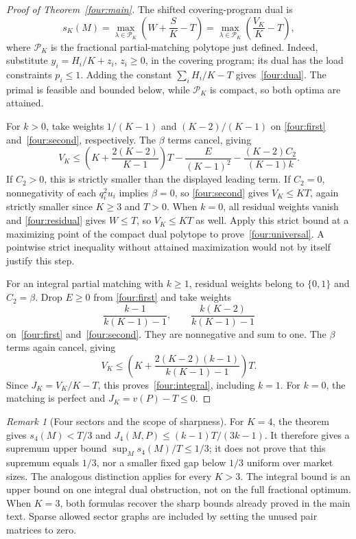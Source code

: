 \documentclass[11pt]{article}
\theoremstyle{remark}
\newtheorem{remark}[theorem]{Remark}
\newcommand{\pack}{\mathcal P}
\begin{document}
\begin{proof}[Proof of Theorem~\ref{four:main}]
The shifted covering-program dual is
\begin{equation}\label{four:dual}
 s_K(M)=\max_{\lambda\in\pack_K}\left(W+\frac SK-T\right)
       =\max_{\lambda\in\pack_K}\left(\frac{V_K}{K}-T\right),
\end{equation}
where $\pack_K$ is the fractional partial-matching polytope just defined.
Indeed, substitute $y_i=H_i/K+z_i$, $z_i\ge0$, in the covering program;
its dual has the load constraints $p_i\le1$. Adding the constant
$\sum_iH_i/K-T$ gives~\eqref{four:dual}. The primal is feasible and
bounded below, while $\pack_K$ is compact, so both optima are attained.

For $k>0$, take weights $1/(K-1)$ and $(K-2)/(K-1)$ on
\eqref{four:first} and~\eqref{four:second}, respectively. The
$\beta$ terms cancel, giving
\begin{equation}\label{four:fractional-combination}
 V_K\le\left(K+\frac{2(K-2)}{K-1}\right)T
         -\frac{E}{(K-1)^2}
         -\frac{(K-2)C_2}{(K-1)k}.
\end{equation}
If $C_2>0$, this is strictly smaller than the displayed leading term.
If $C_2=0$, nonnegativity of each $q_i^2u_i$ implies $\beta=0$, so
\eqref{four:second} gives $V_K\le KT$, again strictly smaller since
$K\ge3$ and $T>0$. When $k=0$, all residual weights vanish and
\eqref{four:residual} gives $W\le T$, so $V_K\le KT$ as well.
Apply this strict bound at a maximizing point of the compact dual
polytope to prove~\eqref{four:universal}. A pointwise strict inequality
without attained maximization would not by itself justify this step.

For an integral partial matching with $k\ge1$, residual weights belong
to $\{0,1\}$ and $C_2=\beta$. Drop $E\ge0$ from
\eqref{four:first} and take weights
\[
       \frac{k-1}{k(K-1)-1},\qquad
       \frac{k(K-2)}{k(K-1)-1}
\]
on~\eqref{four:first} and~\eqref{four:second}. They are nonnegative
and sum to one. The $\beta$ terms again cancel, giving
\[
       V_K\le\left(K+
           \frac{2(K-2)(k-1)}{k(K-1)-1}\right)T.
\]
Since $J_K=V_K/K-T$, this proves~\eqref{four:integral}, including
$k=1$. For $k=0$, the matching is perfect and $J_K=v(P)-T\le0$.
\end{proof}

\begin{remark}[Four sectors and the scope of sharpness]\label{four:scope}
For $K=4$, the theorem gives $s_4(M)<T/3$ and
$J_4(M,P)\le(k-1)T/(3k-1)$. It therefore gives a supremum upper bound
$\sup_M s_4(M)/T\le1/3$; it does not prove that this supremum equals
$1/3$, nor a smaller fixed gap below $1/3$ uniform over market sizes.
The analogous distinction applies for every $K>3$. The integral bound
is an upper bound on one integral dual obstruction, not on the full
fractional optimum. When $K=3$, both formulas recover the sharp bounds
already proved in the main text. Sparse allowed sector graphs are
included by setting the unused pair matrices to zero.
\end{remark}
\end{document}
